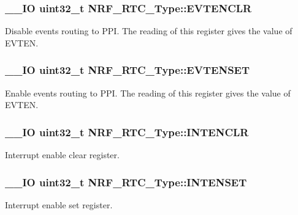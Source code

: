 \subsubsection[{E\+V\+T\+E\+N\+C\+L\+R}]{\setlength{\rightskip}{0pt plus 5cm}\+\_\+\+\_\+\+I\+O uint32\+\_\+t N\+R\+F\+\_\+\+R\+T\+C\+\_\+\+Type\+::\+E\+V\+T\+E\+N\+C\+L\+R}\label{struct_n_r_f___r_t_c___type_aebf19f47f217ef8efc8d70f97d84a1e5}
Disable events routing to P\+P\+I. The reading of this register gives the value of E\+V\+T\+E\+N. \hypertarget{struct_n_r_f___r_t_c___type_a6c39af44d51729919f19f386605c55a1}{}
\subsubsection[{E\+V\+T\+E\+N\+S\+E\+T}]{\setlength{\rightskip}{0pt plus 5cm}\+\_\+\+\_\+\+I\+O uint32\+\_\+t N\+R\+F\+\_\+\+R\+T\+C\+\_\+\+Type\+::\+E\+V\+T\+E\+N\+S\+E\+T}\label{struct_n_r_f___r_t_c___type_a6c39af44d51729919f19f386605c55a1}
Enable events routing to P\+P\+I. The reading of this register gives the value of E\+V\+T\+E\+N. \hypertarget{struct_n_r_f___r_t_c___type_a4cc5c240f6235c4d35675eb21718659d}{}
\subsubsection[{I\+N\+T\+E\+N\+C\+L\+R}]{\setlength{\rightskip}{0pt plus 5cm}\+\_\+\+\_\+\+I\+O uint32\+\_\+t N\+R\+F\+\_\+\+R\+T\+C\+\_\+\+Type\+::\+I\+N\+T\+E\+N\+C\+L\+R}\label{struct_n_r_f___r_t_c___type_a4cc5c240f6235c4d35675eb21718659d}
Interrupt enable clear register. \hypertarget{struct_n_r_f___r_t_c___type_af0d6747fd8cfd233f1e5e78cc72c0d14}{}
\subsubsection[{I\+N\+T\+E\+N\+S\+E\+T}]{\setlength{\rightskip}{0pt plus 5cm}\+\_\+\+\_\+\+I\+O uint32\+\_\+t N\+R\+F\+\_\+\+R\+T\+C\+\_\+\+Type\+::\+I\+N\+T\+E\+N\+S\+E\+T}\label{struct_n_r_f___r_t_c___type_af0d6747fd8cfd233f1e5e78cc72c0d14}
Interrupt enable set register. \hypertarget{struct_n_r_f___r_t_c___type_a6985ce32d3567442748393b332853ed3}{}
